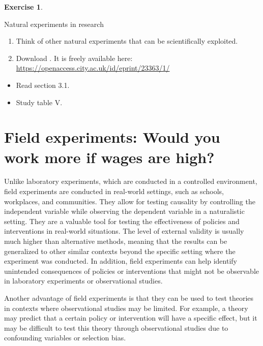 \documentclass[
  12pt,
  oneside]{book}
\providecommand{\tightlist}{%
  \setlength{\itemsep}{0pt}\setlength{\parskip}{0pt}}
\theoremstyle{definition}
\theoremstyle{definition}
\theoremstyle{definition}
\newtheorem{exercise}{Exercise}[chapter]
\theoremstyle{definition}
\theoremstyle{remark}
\begin{document}
\begin{exercise}
\protect\hypertarget{exr:natexperiments}{}\label{exr:natexperiments}

Natural experiments in research

\begin{enumerate}
\def\labelenumi{\alph{enumi})}
\tightlist
\item
  Think of other natural experiments that can be scientifically exploited.
\item
  Download \citet{Sieweke2020Natural}. It is freely available here: \url{https://openaccess.city.ac.uk/id/eprint/23363/1/}
\end{enumerate}

\begin{itemize}
\tightlist
\item
  Read section 3.1.
\item
  Study table V.
\end{itemize}

\end{exercise}

\hypertarget{field-experiments-would-you-work-more-if-wages-are-high}{%
\section{Field experiments: Would you work more if wages are high?}\label{field-experiments-would-you-work-more-if-wages-are-high}}

Unlike laboratory experiments, which are conducted in a controlled environment, field experiments are conducted in real-world settings, such as schools, workplaces, and communities. They allow for testing causality by controlling the independent variable while observing the dependent variable in a naturalistic setting. They are a valuable tool for testing the effectiveness of policies and interventions in real-world situations. The level of external validity is usually much higher than alternative methods, meaning that the results can be generalized to other similar contexts beyond the specific setting where the experiment was conducted. In addition, field experiments can help identify unintended consequences of policies or interventions that might not be observable in laboratory experiments or observational studies.

Another advantage of field experiments is that they can be used to test theories in contexts where observational studies may be limited. For example, a theory may predict that a certain policy or intervention will have a specific effect, but it may be difficult to test this theory through observational studies due to confounding variables or selection bias.
\end{document}
